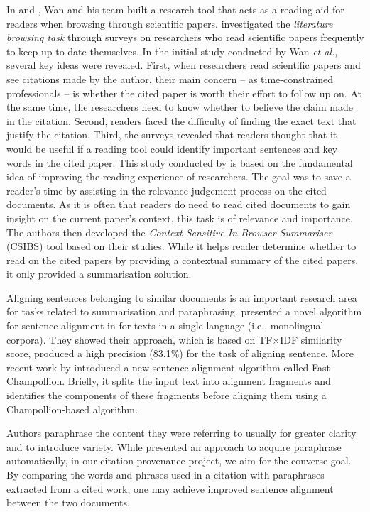 In \cite{citation-sensitive} and \cite{csibs}, Wan and his team built a research tool that acts as a reading aid for readers when browsing through scientific papers.  investigated the \textit{literature browsing task} through surveys on researchers who read scientific papers frequently to keep up-to-date themselves. In the initial study conducted by Wan {\it et al.}, several key ideas were revealed. First, when researchers read scientific papers and see citations made by the author, their main concern -- as time-constrained professionals -- is whether the cited paper is worth their effort to follow up on. At the same time, the researchers need to know whether to believe the claim made in the citation. Second, readers faced the difficulty of finding the exact text that justify the citation. Third, the surveys revealed that readers thought that it would be  useful if a reading tool could identify important sentences and key words in the cited paper. This study conducted by  is based on the fundamental idea of improving the reading experience of researchers. The goal was to save a reader's time by assisting in the relevance judgement process on the cited documents. As it is often that readers do need to read cited documents to gain insight on the current paper's context, this task is of relevance and importance. The authors then developed the {\it Context Sensitive In-Browser Summariser} (CSIBS) tool based on their studies. While it helps reader determine whether to read on the cited papers by providing a contextual summary of the cited papers, 
it only provided a summarisation solution.

Aligning sentences belonging to similar documents is an important research area for tasks related to summarisation and paraphrasing.  presented a novel algorithm for sentence alignment in for texts in a single language (i.e., monolingual corpora). They showed their approach, which is based on
TF$\times$IDF similarity score, produced a high precision (83.1\%) for the task of aligning sentence. More recent work by  introduced a new sentence alignment algorithm called Fast-Champollion. Briefly, it splits the input text into alignment fragments and identifies the components of these fragments before aligning them using a
Champollion-based algorithm.

Authors paraphrase the content they were referring to usually for greater clarity and to introduce variety. While  presented an approach to acquire paraphrase automatically, in our citation provenance project, we aim for the converse goal. By comparing the words and phrases used in a citation with paraphrases extracted from a cited work, one may achieve improved sentence alignment between the two documents.